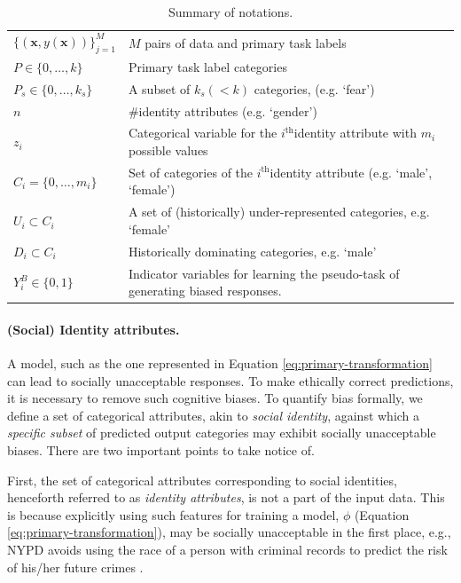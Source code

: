 \documentclass[letterpaper]{article}
\renewcommand{\vec}[1]{\mathbf{#1}}
\newcommand{\ith}{$i^{\mathrm{th}}$}
\begin{document}
\begin{table}[t]
    \centering
    \small
    \begin{tabularx}{\columnwidth}{@{}l@{~~}X@{}}
    \toprule
    $\{(\vec{x}, y(\vec{x}))\}_{j=1}^{M}$ & $M$ pairs of data and primary task labels \\
    $P \in \{0,\ldots,k\}$ & Primary task label categories \\ 
    $P_s \in \{0,\ldots,k_s\}$ & A subset of $k_s (< k)$ categories, (e.g. `fear') \\
    $n$ & \#identity attributes (e.g. `gender') \\
    $z_i$ & Categorical variable for the \ith identity attribute with $m_i$ possible values \\
    $C_i=\{0,\ldots,m_i\}$ & Set of categories of the \ith identity attribute (e.g. `male', `female') \\
    $U_i \subset C_i$ & A set of (historically) under-represented categories, e.g. `female' \\
    $D_i \subset C_i$ & Historically dominating categories, e.g. `male'
    \\
    $Y^B_i \in \{0,1\}$ & Indicator variables for learning the pseudo-task of generating biased responses.\\
    \bottomrule
    \end{tabularx}
    \caption{Summary of notations.}
    \label{tab:notations}
\end{table}

\paragraph{(Social) Identity attributes.}
A model, such as the one represented in Equation \ref{eq:primary-transformation} can lead to socially unacceptable responses. To make ethically correct predictions, it is necessary to remove such cognitive biases. To quantify bias formally, we define a set of categorical attributes, akin to \emph{social identity}, against which a \emph{specific subset} of predicted output categories may exhibit socially unacceptable biases.
There are two important points to take notice of.

First, the set of categorical attributes corresponding to social identities, henceforth referred to as \emph{identity attributes}, is not a part of the input data. This is because explicitly using such features for training a model, $\phi$ (Equation \ref{eq:primary-transformation}), may be socially unacceptable in the first place, e.g., NYPD avoids using the race of a person with criminal records to predict the risk of his/her future crimes \citep{ProPublica}. 
\end{document}
